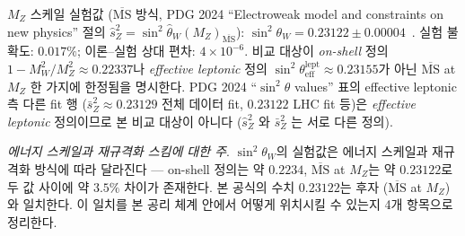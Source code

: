 \documentclass[entropy,article,submit,pdftex,oneauthor]{Definitions/mdpi}
\begin{document}
$M_Z$ 스케일 실험값 ($\overline{\mathrm{MS}}$ 방식, PDG 2024 ``Electroweak model and constraints on new physics'' 절의 $\hat s_Z^2 = \sin^2\hat\theta_W(M_Z)_{\overline{\mathrm{MS}}}$): $\sin^2\theta_W = 0.23122 \pm 0.00004$~\cite{pdg2024}. 실험 불확도: $0.017\%$; 이론--실험 상대 편차: $4 \times 10^{-6}$. 비교 대상이 \emph{on-shell} 정의 $1 - M_W^2/M_Z^2 \approx 0.22337$나 \emph{effective leptonic} 정의 $\sin^2\theta_{\text{eff}}^{\text{lept}} \approx 0.23155$가 아닌 $\overline{\mathrm{MS}}$ at $M_Z$ 한 가지에 한정됨을 명시한다. PDG 2024 ``$\sin^2\theta$ values'' 표의 effective leptonic 측 다른 fit 행 ($\bar s_Z^2 \approx 0.23129$ 전체 데이터 fit, $0.23122$ LHC fit 등)은 \emph{effective leptonic} 정의이므로 본 비교 대상이 아니다 ($\hat s_Z^2$ 와 $\bar s_Z^2$ 는 서로 다른 정의).

\emph{에너지 스케일과 재규격화 스킴에 대한 주}.
$\sin^2\theta_W$의 실험값은 에너지 스케일과 재규격화 방식에 따라 달라진다 — on-shell 정의는 약 $0.2234$, $\overline{\mathrm{MS}}$ at $M_Z$는 약 $0.23122$로 두 값 사이에 약 $3.5\%$ 차이가 존재한다. 본 공식의 수치 $0.23122$는 후자 ($\overline{\mathrm{MS}}$ at $M_Z$)와 일치한다. 이 일치를 본 공리 체계 안에서 어떻게 위치시킬 수 있는지 4개 항목으로 정리한다.
\end{document}
